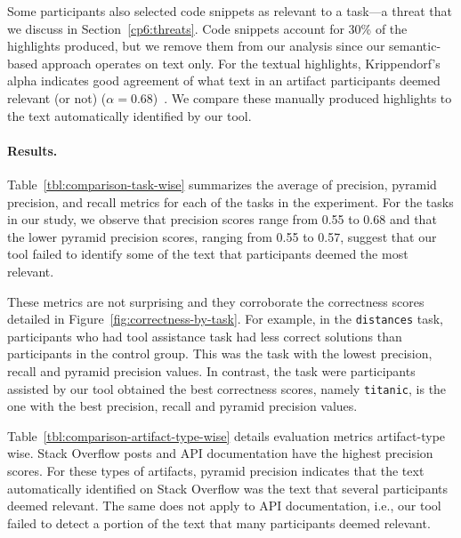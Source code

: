 Some participants also selected code snippets as relevant to a task---a threat that we discuss in Section~\ref{cp6:threats}. 
Code snippets account for 30\% of the highlights produced, but we remove them from our analysis since our semantic-based approach 
operates on text only. For the textual highlights,
Krippendorf's alpha indicates good agreement of what text in an artifact participants deemed relevant (or not) ($\alpha = 0.68$)~\cite{Krippendorff1980, passonneau2006}.
We compare these manually produced highlights to the text automatically identified by our tool.





\paragraph{\textbf{Results.}}




Table~\ref{tbl:comparison-task-wise} summarizes the average of precision, pyramid precision, and recall metrics for each of the tasks in the experiment.
For the tasks in our study, we observe that precision scores range from 0.55 to 0.68 and that 
the lower pyramid precision scores, ranging from 0.55 to 0.57, suggest that our tool failed to identify some of the text that participants deemed the most relevant.




These metrics are not surprising and they corroborate 
the correctness scores detailed in Figure~\ref{fig:correctness-by-task}. For example, 
in the \texttt{distances} task, participants who had tool assistance  task had less correct solutions than participants in the control group.
This was the task with the lowest precision, recall and pyramid precision values. 
In contrast, the task were participants assisted by our tool obtained the best correctness scores, namely \texttt{titanic}, is the one with the best precision, recall and pyramid precision values.








Table~\ref{tbl:comparison-artifact-type-wise} details evaluation metrics artifact-type wise. 
Stack Overflow posts and API documentation have the highest precision scores. For these types of artifacts, pyramid precision indicates that the 
text automatically identified on Stack Overflow was the text that several participants deemed relevant. 
The same does not apply to API documentation, i.e., our tool failed to detect a portion of the text that many participants deemed relevant. 


